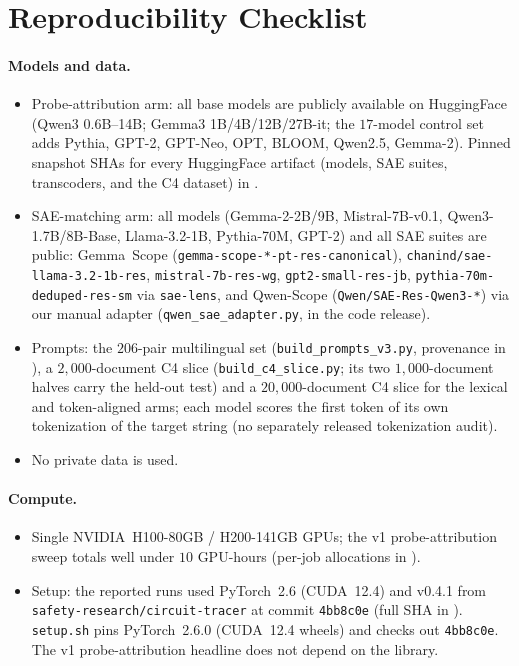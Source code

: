\section{Reproducibility Checklist}\label{app:repro}

\paragraph{Models and data.}
\begin{itemize}[leftmargin=*,topsep=2pt,itemsep=2pt]
  \item Probe-attribution arm: all base models are publicly available on HuggingFace
  (Qwen3 0.6B--14B; Gemma3 1B/4B/12B/27B-it; the $17$-model control set adds Pythia, GPT-2,
  GPT-Neo, OPT, BLOOM, Qwen2.5, Gemma-2). Pinned snapshot SHAs for every
  HuggingFace artifact (models, SAE suites, transcoders, and the C4 dataset)
  in .
  \item SAE-matching arm: all models (Gemma-2-2B/9B, Mistral-7B-v0.1, Qwen3-1.7B/8B-Base,
  Llama-3.2-1B, Pythia-70M, GPT-2) and all SAE suites are public: Gemma~Scope (\texttt{gemma-scope-*-pt-res-canonical}),
  \texttt{chanind/sae-llama-3.2-1b-res}, \texttt{mistral-7b-res-wg},
  \texttt{gpt2-small-res-jb}, \texttt{pythia-70m-deduped-res-sm} via \texttt{sae-lens},
  and Qwen-Scope (\texttt{Qwen/SAE-Res-Qwen3-*}) via our manual adapter
  (\texttt{qwen\_sae\_adapter.py}, in the code release).
  \item Prompts: the $206$-pair multilingual set (\texttt{build\_prompts\_v3.py},
  provenance in ), a $2{,}000$-document C4 slice
  (\texttt{build\_c4\_slice.py}; its two $1{,}000$-document halves carry the held-out test) and a
  $20{,}000$-document C4 slice for the lexical and token-aligned arms; each model scores the first token of its own
  tokenization of the target string (no separately released tokenization audit).
  \item No private data is used.
\end{itemize}

\paragraph{Compute.}
\begin{itemize}[leftmargin=*,topsep=2pt,itemsep=2pt]
  \item Single NVIDIA~H100-80GB / H200-141GB GPUs; the v1
  probe-attribution sweep totals well under $10$ GPU-hours
  (per-job allocations in ).
  \item Setup: the reported runs used PyTorch~2.6 (CUDA~12.4) and
  \circuittracer{} v0.4.1 from \texttt{safety-research/circuit-tracer} at commit
  \texttt{4bb8c0e} (full SHA in ). \texttt{setup.sh} pins
  PyTorch~2.6.0 (CUDA~12.4 wheels) and checks out \circuittracer{} \texttt{4bb8c0e}. The v1 probe-attribution headline does not depend on the
  \circuittracer{} library.
\end{itemize}

